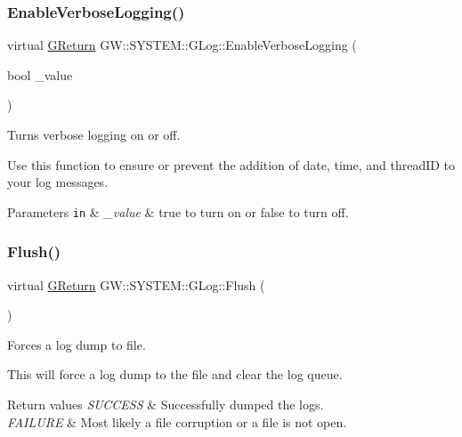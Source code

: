\subsubsection{\texorpdfstring{Enable\+Verbose\+Logging()}{EnableVerboseLogging()}}
{\footnotesize\ttfamily virtual \mbox{\hyperlink{namespace_g_w_a67a839e3df7ea8a5c5686613a7a3de21}{G\+Return}} G\+W\+::\+S\+Y\+S\+T\+E\+M\+::\+G\+Log\+::\+Enable\+Verbose\+Logging (\begin{DoxyParamCaption}\item[{bool}]{\+\_\+value }\end{DoxyParamCaption})\hspace{0.3cm}{\ttfamily [pure virtual]}}



Turns verbose logging on or off. 

Use this function to ensure or prevent the addition of date, time, and thread\+ID to your log messages.


\begin{DoxyParams}[1]{Parameters}
\mbox{\tt in}  & {\em \+\_\+value} & true to turn on or false to turn off. \\
\hline
\end{DoxyParams}
\mbox{\label{class_g_w_1_1_s_y_s_t_e_m_1_1_g_log_a07147c15ecb17caa1c83974b3c54f7d4}} 
\subsubsection{\texorpdfstring{Flush()}{Flush()}}
{\footnotesize\ttfamily virtual \mbox{\hyperlink{namespace_g_w_a67a839e3df7ea8a5c5686613a7a3de21}{G\+Return}} G\+W\+::\+S\+Y\+S\+T\+E\+M\+::\+G\+Log\+::\+Flush (\begin{DoxyParamCaption}{ }\end{DoxyParamCaption})\hspace{0.3cm}{\ttfamily [pure virtual]}}



Forces a log dump to file. 

This will force a log dump to the file and clear the log queue.


\begin{DoxyRetVals}{Return values}
{\em S\+U\+C\+C\+E\+SS} & Successfully dumped the logs. \\
\hline
{\em F\+A\+I\+L\+U\+RE} & Most likely a file corruption or a file is not open. \\
\hline
\end{DoxyRetVals}
\mbox{\label{class_g_w_1_1_s_y_s_t_e_m_1_1_g_log_a9e21e702d012065fe799b4c49f7ac670}} 
